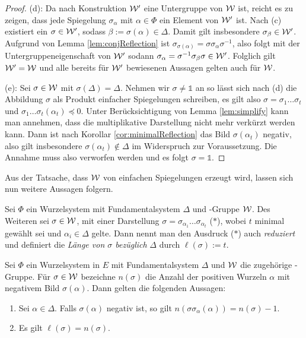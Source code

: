 \begin{proof}
  (d):
  Da nach Konstruktion $\mathcal{W}'$ eine Untergruppe von $\mathcal{W}$ ist, reicht es zu zeigen, dass jede Spiegelung $\sigma_\alpha$ mit $\alpha \in \Phi$ ein Element von $\mathcal{W}'$ ist.
  Nach (c) existiert ein $\sigma \in \mathcal{W}'$, sodass $\beta := \sigma(\alpha) \in \Delta$.
  Damit gilt insbesondere $\sigma_\beta \in \mathcal{W}'$.
  Aufgrund von Lemma \ref{lem:conjReflection} ist $\sigma_{\sigma(\alpha)} = \sigma \sigma_\alpha \sigma^{-1}$, also folgt mit der Untergruppeneigenschaft von $\mathcal{W}'$ sodann $\sigma_\alpha = \sigma^{-1} \sigma_\beta \sigma \in \mathcal{W}'$.
  Folglich gilt $\mathcal{W}' = \mathcal{W}$ und alle bereits für $\mathcal{W}'$ bewiesenen Aussagen gelten auch für $\mathcal{W}$.

  (e):
  Sei $\sigma \in \mathcal{W}$ mit $\sigma(\Delta) = \Delta$.
  Nehmen wir $\sigma \neq \mathds{1}$ an so lässt sich nach (d) die Abbildung $\sigma$ als Produkt einfacher Spiegelungen schreiben, es gilt also $\sigma = \sigma_1\dots\sigma_t$ und $\sigma_1 \dots \sigma_t(\alpha_t) \preceq 0$. 
  Unter Berücksichtigung von Lemma \ref{lem:simplify} kann man annehmen, dass die multiplikative Darstellung nicht mehr verkürzt werden kann.
  Dann ist nach Korollar \ref{cor:minimalReflection} das Bild $\sigma(\alpha_t)$ negativ, also gilt insbesondere $\sigma(\alpha_t) \not\in \Delta$ im Widerspruch zur Voraussetzung.
  Die Annahme muss also verworfen werden und es folgt $\sigma = \mathds{1}$.
\end{proof}

Aus der Tatsache, dass $\mathcal{W}$ von einfachen Spiegelungen erzeugt wird, lassen sich nun weitere Aussagen folgern.

\begin{defn}
  Sei $\Phi$ ein Wurzelsystem mit Fundamentalsystem $\Delta$ und \weyl\hyp{}Gruppe $\mathcal{W}$. 
  Des Weiteren sei $\sigma \in \mathcal{W}$, mit einer Darstellung $\sigma = \sigma_{\alpha_1}\dots\sigma_{\alpha_t}$ ($\ast$), wobei $t$ minimal gewählt sei und $\alpha_i \in \Delta$ gelte. 
  Dann nennt man den Ausdruck ($\ast$) auch \emph{reduziert} und definiert die \emph{Länge von $\sigma$ bezüglich} $\Delta$ durch $\ell(\sigma) := t$.
\end{defn}

\begin{lem}
  \label{lem:lengthAndNegativeRoots}
  Sei $\Phi$ ein Wurzelsystem in $E$ mit Fundamentalsystem $\Delta$ und $\mathcal{W}$ die zugehörige \weyl\hyp{}Gruppe.
  Für $\sigma \in \mathcal{W}$ bezeichne $n(\sigma)$ die Anzahl der positiven Wurzeln $\alpha$ mit negativem Bild $\sigma(\alpha)$.
  Dann gelten die folgenden Aussagen:
  \begin{enumerate}[(1)]
    \item Sei $\alpha \in \Delta$. Falls $\sigma(\alpha)$ negativ ist, so gilt $n(\sigma\sigma_\alpha(\alpha)) = n(\sigma) - 1$.
    \item Es gilt $\ell(\sigma) = n(\sigma)$.
  \end{enumerate}
\end{lem}

